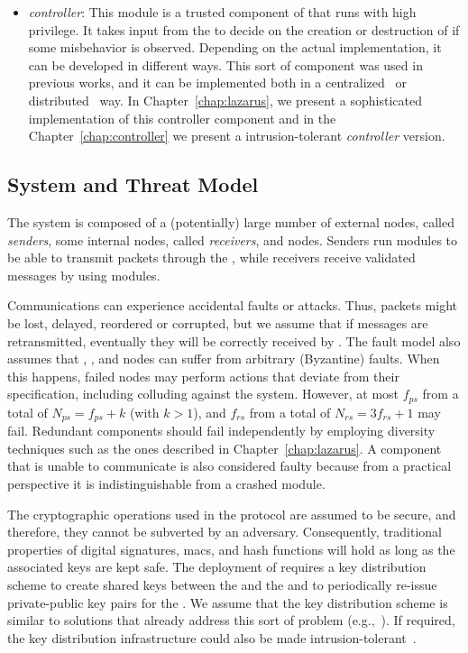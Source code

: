 \begin{itemize}
\item \emph{controller}: This module is a trusted component of \sieveq that runs with high privilege.
It takes input from the \repsieves to decide on the creation or destruction of \presieves if some misbehavior is observed.
Depending on the actual \sieveq implementation, it can be developed in different ways.
This sort of component was used in previous works, and it can be implemented both in a centralized~\cite{Roeder:2010,Platania:2014} or distributed~\cite{Sousa:2010} way.
In Chapter~\ref{chap:lazarus}, we present a sophisticated implementation of this controller component and in the Chapter~\ref{chap:controller} we present a intrusion-tolerant \emph{controller} version.


\end{itemize}



\subsection{System and Threat Model}
\label{fault_model}

The system is composed of a (potentially) large number of external nodes, called \emph{senders}, some internal nodes, called \emph{receivers}, and \system nodes.
Senders run \sender modules to be able to transmit packets through the \system, while receivers receive validated messages by using \postsieve modules. 

Communications can experience accidental faults or attacks.
Thus, packets might be lost, delayed, reordered or corrupted, but we assume that if messages are retransmitted, eventually they will be correctly received by \sieveq.
The fault model also assumes that \sender, \presieve, and \repsieve nodes can suffer from arbitrary (Byzantine) faults.
When this happens, failed nodes may perform actions that deviate from their specification, including colluding against the system.
However, at most $f_{ps}$ \presieves from a total of $N_{ps} = f_{ps} + k$ (with $k > 1$), and $f_{rs}$ \repsieve from a total of $N_{rs} = 3f_{rs}+1$ may fail.
Redundant components should fail independently by employing diversity techniques such as the ones described in Chapter~\ref{chap:lazarus}.
A component that is unable to communicate is also considered faulty because from a practical perspective it is indistinguishable from a crashed module.

The cryptographic operations used in the \sieveq protocol are assumed to be secure, and therefore, they cannot be subverted by an adversary. 
Consequently, traditional properties of digital signatures, \glspl{mac}, and hash functions will hold as long as the associated keys are kept safe.
The deployment of \sieveq requires a key distribution scheme to create shared keys between the \sender and the \presieve and to periodically re-issue private-public key pairs for the \sender.
We assume that the key distribution scheme is similar to solutions that already address this sort of problem (e.g.,~\cite{Harkins:1998}).
If required, the key distribution infrastructure could also be made intrusion-tolerant~\cite{Kreutz:2014,Zhou:2002}.


